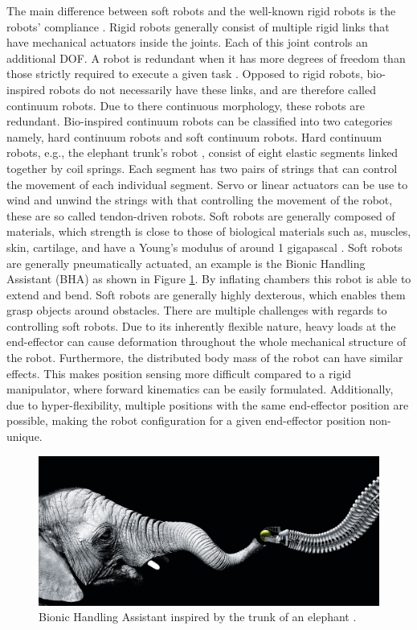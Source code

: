 The main difference between soft robots and the well-known rigid robots is the robots' compliance \cite{trivedi2008soft}. Rigid robots generally consist of multiple rigid links that have mechanical actuators inside the joints. Each of this joint controls an additional DOF. A robot is redundant when it has more degrees of freedom than those strictly required to execute a given task \cite{chiaverini2016redundant}. Opposed to rigid robots, bio-inspired robots do not necessarily have these links, and are therefore called continuum robots. Due to there continuous morphology, these robots are redundant. Bio-inspired continuum robots can be classified into two categories namely, hard continuum robots and soft continuum robots. Hard continuum robots, e.g., the elephant trunk's robot  \cite{cieslak1999elephant}, consist of eight elastic segments linked together by coil springs. Each segment has two pairs of strings that can control the movement of each individual segment. Servo or linear actuators can be use to wind and unwind the strings with that controlling the movement of the robot, these are so called tendon-driven robots. Soft robots are generally composed of materials, which strength is close to those of biological materials such as, muscles, skin, cartilage, and have a Young's modulus of around 1 gigapascal \cite{rus2015design}. Soft robots are generally pneumatically actuated, an example is the Bionic Handling Assistant (BHA) \cite{rolf2012constant} as shown in Figure \ref{fig:BHA}. By inflating chambers this robot is able to extend and bend. Soft robots are generally highly dexterous, which enables them grasp objects around obstacles. There are multiple challenges with regards to controlling soft robots. Due to its inherently flexible nature, heavy loads at the end-effector can cause deformation throughout the whole mechanical structure of the robot. Furthermore, the distributed body mass of the robot can have similar effects. This makes position sensing more difficult compared to a rigid manipulator, where forward kinematics can be easily formulated. Additionally, due to hyper-flexibility, multiple positions with the same end-effector position are possible, making the robot configuration for a given end-effector position non-unique.

\begin{figure}[H]
    \centering
    \includegraphics[width = \textwidth]{Figures/BHAelephant.jpg}
    \caption{Bionic Handling Assistant inspired by the trunk of an elephant \cite{BHA}.}
    \label{fig:BHA}
\end{figure}

